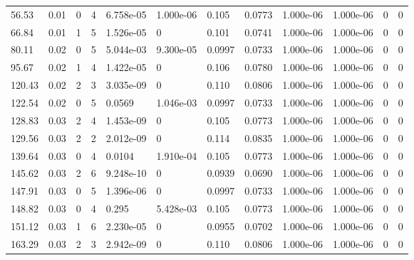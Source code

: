\documentclass[preview]{standalone}
\begin{document}
{{\begin{tabular}{L{1.2cm}C{1.2cm} C{0.3cm}C{0.5cm} C{1.4cm}C{1.4cm} C{1.4cm}C{1.4cm} C{1.6cm}C{1.6cm} C{1.6cm}C{1.6cm}}
  56.53  &  0.01  & 0     &  4 &  6.758e-05  & 1.000e-06  &  0.105&   0.0773& 1.000e-06 & 1.000e-06   &  0 & 0  \\ 
  66.84  &  0.01  & 1     &  5 &  1.526e-05  & 0  &  0.101&   0.0741& 1.000e-06 & 1.000e-06   &  0 & 0  \\ 
  80.11  &  0.02  & 0     &  5 &  5.044e-03  & 9.300e-05  &  0.0997&   0.0733& 1.000e-06 & 1.000e-06   &  0 & 0  \\ 
  95.67  &  0.02  & 1     &  4 &  1.422e-05  & 0  &  0.106&   0.0780& 1.000e-06 & 1.000e-06   &  0 & 0  \\ 
  120.43  &  0.02  & 2     &  3 &  3.035e-09  & 0  &  0.110&   0.0806& 1.000e-06 & 1.000e-06   &  0 & 0  \\ 
  122.54  &  0.02  & 0     &  5 &  0.0569  & 1.046e-03  &  0.0997&   0.0733& 1.000e-06 & 1.000e-06   &  0 & 0  \\ 
  128.83  &  0.03  & 2     &  4 &  1.453e-09  & 0  &  0.105&   0.0773& 1.000e-06 & 1.000e-06   &  0 & 0  \\ 
  129.56  &  0.03  & 2     &  2 &  2.012e-09  & 0  &  0.114&   0.0835& 1.000e-06 & 1.000e-06   &  0 & 0  \\ 
  139.64  &  0.03  & 0     &  4 &  0.0104  & 1.910e-04  &  0.105&   0.0773& 1.000e-06 & 1.000e-06   &  0 & 0  \\ 
  145.62  &  0.03  & 2     &  6 &  9.248e-10  & 0  &  0.0939&   0.0690& 1.000e-06 & 1.000e-06   &  0 & 0  \\ 
  147.91  &  0.03  & 0     &  5 &  1.396e-06  & 0  &  0.0997&   0.0733& 1.000e-06 & 1.000e-06   &  0 & 0  \\ 
  148.82  &  0.03  & 0     &  4 &  0.295  & 5.428e-03  &  0.105&   0.0773& 1.000e-06 & 1.000e-06   &  0 & 0  \\ 
  151.12  &  0.03  & 1     &  6 &  2.230e-05  & 0  &  0.0955&   0.0702& 1.000e-06 & 1.000e-06   &  0 & 0  \\ 
  163.29  &  0.03  & 2     &  3 &  2.942e-09  & 0  &  0.110&   0.0806& 1.000e-06 & 1.000e-06   &  0 & 0  \\ 
\hline 
\end{tabular} 

}}
\end{document}
